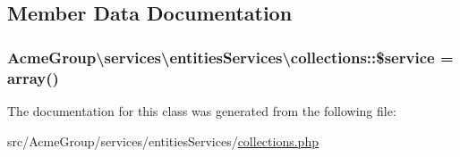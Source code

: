 \subsection{Member Data Documentation}
\hypertarget{class_acme_group_1_1services_1_1entities_services_1_1collections_a28fe220d06a0c4a3e94f922546927fab}{
\subsubsection[{\$service}]{\setlength{\rightskip}{0pt plus 5cm}Acme\+Group\textbackslash{}services\textbackslash{}entities\+Services\textbackslash{}collections\+::\$service = array()\hspace{0.3cm}{\ttfamily [protected]}}}\label{class_acme_group_1_1services_1_1entities_services_1_1collections_a28fe220d06a0c4a3e94f922546927fab}


The documentation for this class was generated from the following file\+:\begin{DoxyCompactItemize}
\item 
src/\+Acme\+Group/services/entities\+Services/\hyperlink{collections_8php}{collections.\+php}\end{DoxyCompactItemize}
